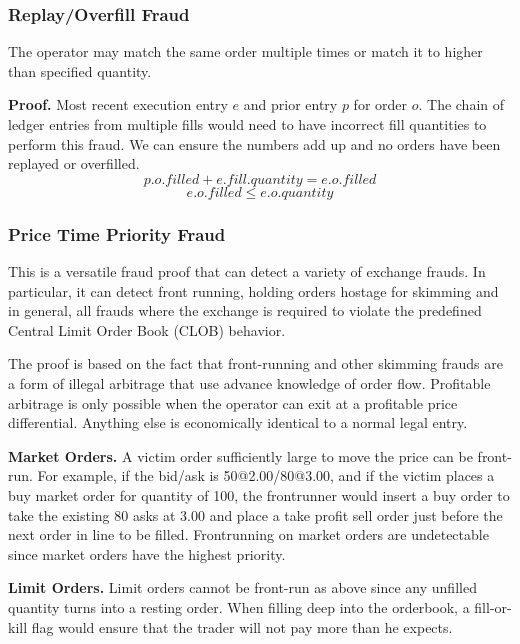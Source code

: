 \documentclass[12pt,a4paper]{article}
\begin{document}
\subsubsection{Replay/Overfill Fraud} \label{fp:rof}
The operator may match the same order multiple times or match it to higher than specified quantity.

\textbf{Proof.} 
Most recent execution entry $e$ and prior entry $p$ for order $o$. The chain of ledger entries from multiple fills would need to have incorrect fill quantities to perform this fraud. We can ensure the numbers add up and no orders have been replayed or overfilled.
\begin{equation}p.o.filled + e.fill.quantity = e.o.filled\end{equation}
\begin{equation}
    e.o.filled \leq e.o.quantity
\end{equation}
\subsubsection{Price Time Priority Fraud}\label{fp:ptp}
This is a versatile fraud proof that can detect a variety of exchange frauds. In particular, it can detect front running, holding orders hostage for skimming and in general, all frauds where the exchange is required to violate the predefined Central Limit Order Book (CLOB) behavior. 

The proof is based on the fact that front-running and other skimming frauds are a form of illegal arbitrage that use advance knowledge of order flow. Profitable arbitrage is only possible when the operator can exit at a profitable price differential. Anything else is economically identical to a normal legal entry.

\textbf{Market Orders.} A victim order sufficiently large to move the price can be front-run. For example, if the bid/ask is 50@2.00/80@3.00, and if the victim places a buy market order for quantity of 100, the frontrunner would insert a buy order to take the existing 80 asks at 3.00 and place a take profit sell order just before the next order in line to be filled. Frontrunning on market orders are undetectable since market orders have the highest priority.

\textbf{Limit Orders.} Limit orders cannot be front-run as above since any unfilled quantity turns into a resting order. When filling deep into the orderbook, a fill-or-kill flag would ensure that the trader will not pay more than he expects.
\end{document}
